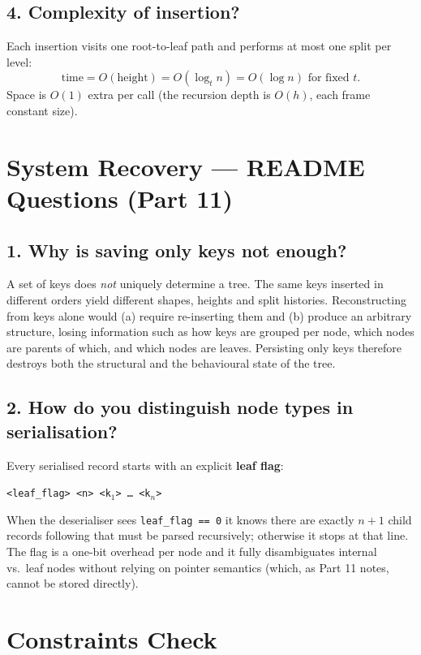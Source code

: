 \documentclass[11pt,a4paper]{article}
\begin{document}
\subsection*{4. Complexity of insertion?}
Each insertion visits one root-to-leaf path and performs at most one split per level:
\[
    \text{time} = O(\text{height}) = O(\log_t n) = O(\log n) \text{ for fixed } t.
\]
Space is $O(1)$ extra per call (the recursion depth is $O(h)$, each frame constant size).

\section{System Recovery --- README Questions (Part 11)}

\subsection*{1. Why is saving only keys not enough?}
A set of keys does \emph{not} uniquely determine a tree. The same keys inserted in different orders yield different shapes, heights and split histories. Reconstructing from keys alone would (a) require re-inserting them and (b) produce an arbitrary structure, losing information such as how keys are grouped per node, which nodes are parents of which, and which nodes are leaves. Persisting only keys therefore destroys both the structural and the behavioural state of the tree.

\subsection*{2. How do you distinguish node types in serialisation?}
Every serialised record starts with an explicit \textbf{leaf flag}:
\begin{center}
\texttt{<leaf\_flag>\ <n>\ <k$_1$>\ \ldots\ <k$_n$>}
\end{center}
When the deserialiser sees \texttt{leaf\_flag == 0} it knows there are exactly $n{+}1$ child records following that must be parsed recursively; otherwise it stops at that line. The flag is a one-bit overhead per node and it fully disambiguates internal vs.\ leaf nodes without relying on pointer semantics (which, as Part 11 notes, cannot be stored directly).

\section{Constraints Check}
\end{document}
